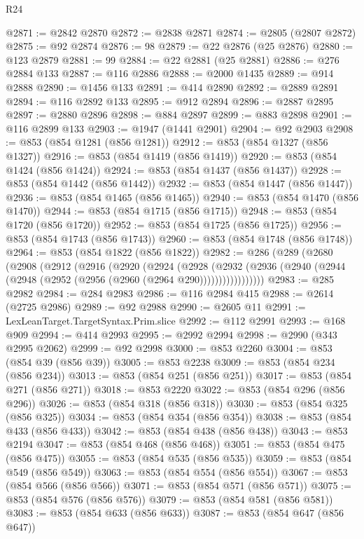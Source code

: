 \begin{lexlean}{R24}
\begin{coremodule}
@2871 := @2842 @2870
@2872 := @2838 @2871
@2874 := @2805 (@2807 @2872)
@2875 := @92 @2874
@2876 := 98
@2879 := @22 @2876 (@25 @2876)
@2880 := @123 @2879
@2881 := 99
@2884 := @22 @2881 (@25 @2881)
@2886 := @276 @2884 @133
@2887 := @116 @2886
@2888 := @2000 @1435
@2889 := @914 @2888
@2890 := @1456 @133
@2891 := @414 @2890
@2892 := @2889 @2891
@2894 := @116 @2892 @133
@2895 := @912 @2894
@2896 := @2887 @2895
@2897 := @2880 @2896
@2898 := @884 @2897
@2899 := @883 @2898
@2901 := @116 @2899 @133
@2903 := @1947 (@1441 @2901)
@2904 := @92 @2903
@2908 := @853 (@854 @1281 (@856 @1281))
@2912 := @853 (@854 @1327 (@856 @1327))
@2916 := @853 (@854 @1419 (@856 @1419))
@2920 := @853 (@854 @1424 (@856 @1424))
@2924 := @853 (@854 @1437 (@856 @1437))
@2928 := @853 (@854 @1442 (@856 @1442))
@2932 := @853 (@854 @1447 (@856 @1447))
@2936 := @853 (@854 @1465 (@856 @1465))
@2940 := @853 (@854 @1470 (@856 @1470))
@2944 := @853 (@854 @1715 (@856 @1715))
@2948 := @853 (@854 @1720 (@856 @1720))
@2952 := @853 (@854 @1725 (@856 @1725))
@2956 := @853 (@854 @1743 (@856 @1743))
@2960 := @853 (@854 @1748 (@856 @1748))
@2964 := @853 (@854 @1822 (@856 @1822))
@2982 := @286
    (@289
      (@2680
        (@2908
          (@2912
            (@2916
              (@2920
                (@2924
                  (@2928
                    (@2932
                      (@2936 (@2940 (@2944 (@2948 (@2952 (@2956 (@2960 (@2964 @290)))))))))))))))))
@2983 := @285 @2982
@2984 := @284 @2983
@2986 := @116 @2984 @415
@2988 := @2614 (@2725 @2986)
@2989 := @92 @2988
@2990 := @2605 @11
@2991 := LexLeanTarget.TargetSyntax.Prim.slice
@2992 := @112 @2991
@2993 := @168 @909
@2994 := @414 @2993
@2995 := @2992 @2994
@2998 := @2990 (@343 @2995 @2062)
@2999 := @92 @2998
@3000 := @853 @2260
@3004 := @853 (@854 @39 (@856 @39))
@3005 := @853 @2238
@3009 := @853 (@854 @234 (@856 @234))
@3013 := @853 (@854 @251 (@856 @251))
@3017 := @853 (@854 @271 (@856 @271))
@3018 := @853 @2220
@3022 := @853 (@854 @296 (@856 @296))
@3026 := @853 (@854 @318 (@856 @318))
@3030 := @853 (@854 @325 (@856 @325))
@3034 := @853 (@854 @354 (@856 @354))
@3038 := @853 (@854 @433 (@856 @433))
@3042 := @853 (@854 @438 (@856 @438))
@3043 := @853 @2194
@3047 := @853 (@854 @468 (@856 @468))
@3051 := @853 (@854 @475 (@856 @475))
@3055 := @853 (@854 @535 (@856 @535))
@3059 := @853 (@854 @549 (@856 @549))
@3063 := @853 (@854 @554 (@856 @554))
@3067 := @853 (@854 @566 (@856 @566))
@3071 := @853 (@854 @571 (@856 @571))
@3075 := @853 (@854 @576 (@856 @576))
@3079 := @853 (@854 @581 (@856 @581))
@3083 := @853 (@854 @633 (@856 @633))
@3087 := @853 (@854 @647 (@856 @647))

\end{coremodule}
\end{lexlean}
